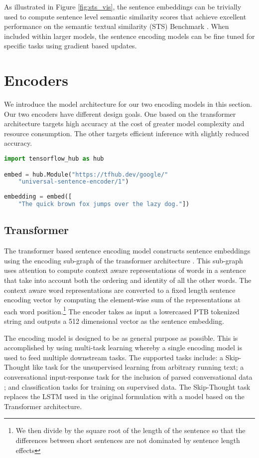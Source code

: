 \documentclass[11pt,a4paper]{article}
\begin{document}
As illustrated in Figure \ref{fig:sts_vis}, the sentence embeddings can be trivially used to compute sentence level semantic similarity scores that achieve excellent performance on the semantic textual similarity (STS) Benchmark \cite{cer2017}. When included within larger models, the sentence encoding models can be fine tuned for specific tasks using gradient based updates. 


\section{Encoders}
We introduce the model architecture for our two encoding models in this section. Our two encoders have different design goals. One based on the transformer architecture targets high accuracy at the cost of greater model complexity and resource consumption. The other targets efficient inference with slightly reduced accuracy.


\lstset{framesep=5pt}
\begin{lstlisting}[language=Python,label=uesnippet,float,caption=Python example code for using the universal sentence encoder.]
import tensorflow_hub as hub

embed = hub.Module("https://tfhub.dev/google/"
    "universal-sentence-encoder/1")
    
embedding = embed([
    "The quick brown fox jumps over the lazy dog."])
\end{lstlisting}

\subsection{Transformer}

The transformer based sentence encoding model constructs sentence embeddings using the encoding sub-graph of the transformer architecture \cite{vaswani2017}. This sub-graph uses attention to compute context aware representations of words in a sentence that take into account both the ordering and identity of all the other words. The context aware word representations are converted to a fixed length sentence encoding vector by computing the element-wise sum of the representations at each word position.\footnote{We then divide by the square root of the length of the sentence so that the differences between short sentences are not dominated by sentence length effects} The encoder takes as input a lowercased PTB tokenized string and outputs a 512 dimensional vector as the sentence embedding. 

The encoding model is designed to be as general purpose as possible. This is accomplished by using multi-task learning whereby a single encoding model is used to feed multiple downstream tasks. The supported tasks include: a Skip-Thought like task \cite{kiros2015} for the unsupervised learning from arbitrary running text; a conversational input-response task for the inclusion of parsed conversational data \cite{henderson2017}; and classification tasks for training on supervised data. The Skip-Thought task replaces the LSTM \cite{hochreiter1997} used in the original formulation with a model based on the Transformer architecture.
\end{document}
